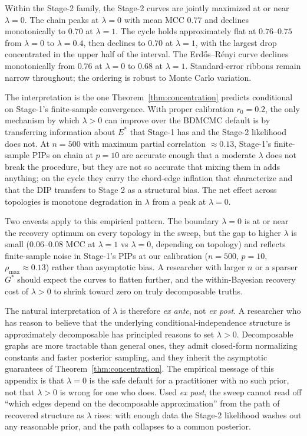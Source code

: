 Within the Stage-2 family, the Stage-2 curves are jointly maximized at or near $\lambda = 0$. The chain peaks at $\lambda = 0$ with mean MCC $0.77$ and declines monotonically to $0.70$ at $\lambda = 1$. The cycle holds approximately flat at $0.76$--$0.75$ from $\lambda = 0$ to $\lambda = 0.4$, then declines to $0.70$ at $\lambda = 1$, with the largest drop concentrated in the upper half of the interval. The Erd\H{o}s--R\'enyi curve declines monotonically from $0.76$ at $\lambda = 0$ to $0.68$ at $\lambda = 1$. Standard-error ribbons remain narrow throughout; the ordering is robust to Monte Carlo variation.

The interpretation is the one Theorem~\ref{thm:concentration} predicts conditional on Stage-1's finite-sample convergence. With proper calibration $r_0 = 0.2$, the only mechanism by which $\lambda > 0$ can improve over the BDMCMC default is by transferring information about $E^*$ that Stage-1 has and the Stage-2 likelihood does not. At $n = 500$ with maximum partial correlation $\approx 0.13$, Stage-1's finite-sample PIPs on chain at $p = 10$ are accurate enough that a moderate $\lambda$ does not break the procedure, but they are not so accurate that mixing them in adds anything; on the cycle they carry the chord-edge inflation that \textcite{niu2020bayesian} characterize and that the DIP transfers to Stage 2 as a structural bias. The net effect across topologies is monotone degradation in $\lambda$ from a peak at $\lambda = 0$.

Two caveats apply to this empirical pattern. The boundary $\lambda = 0$ is at or near the recovery optimum on every topology in the sweep, but the gap to higher $\lambda$ is small ($0.06$--$0.08$ MCC at $\lambda = 1$ vs $\lambda = 0$, depending on topology) and reflects finite-sample noise in Stage-1's PIPs at our calibration ($n = 500$, $p = 10$, $\rho_{\max} \approx 0.13$) rather than asymptotic bias. A researcher with larger $n$ or a sparser $G^*$ should expect the curves to flatten further, and the within-Bayesian recovery cost of $\lambda > 0$ to shrink toward zero on truly decomposable truths.

The natural interpretation of $\lambda$ is therefore \textit{ex ante}, not \textit{ex post}. A researcher who has reason to believe that the underlying conditional-independence structure is approximately decomposable has principled reasons to set $\lambda > 0$. Decomposable graphs are more tractable than general ones, they admit closed-form normalizing constants and faster posterior sampling, and they inherit the asymptotic guarantees of Theorem~\ref{thm:concentration}. The empirical message of this appendix is that $\lambda = 0$ is the safe default for a practitioner with no such prior, not that $\lambda > 0$ is wrong for one who does. Used \textit{ex post}, the sweep cannot read off ``which edges depend on the decomposable approximation'' from the path of recovered structure as $\lambda$ rises: with enough data the Stage-2 likelihood washes out any reasonable prior, and the path collapses to a common posterior.

